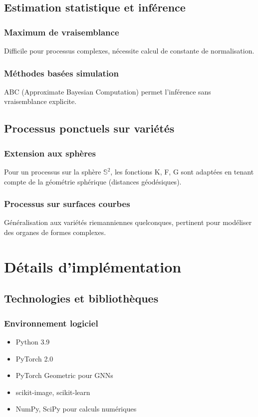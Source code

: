 \section{Estimation statistique et inférence}

\subsection{Maximum de vraisemblance}
Difficile pour processus complexes, nécessite calcul de constante de normalisation.

\subsection{Méthodes basées simulation}
ABC (Approximate Bayesian Computation) permet l'inférence sans vraisemblance explicite.

\section{Processus ponctuels sur variétés}

\subsection{Extension aux sphères}
Pour un processus sur la sphère $\mathbb{S}^2$, les fonctions K, F, G sont adaptées en tenant compte de la géométrie sphérique (distances géodésiques).

\subsection{Processus sur surfaces courbes}
Généralisation aux variétés riemanniennes quelconques, pertinent pour modéliser des organes de formes complexes.

\chapter{Détails d'implémentation}

\section{Technologies et bibliothèques}

\subsection{Environnement logiciel}
\begin{itemize}
    \item Python 3.9
    \item PyTorch 2.0
    \item PyTorch Geometric pour GNNs
    \item scikit-image, scikit-learn
    \item NumPy, SciPy pour calculs numériques
\end{itemize}

